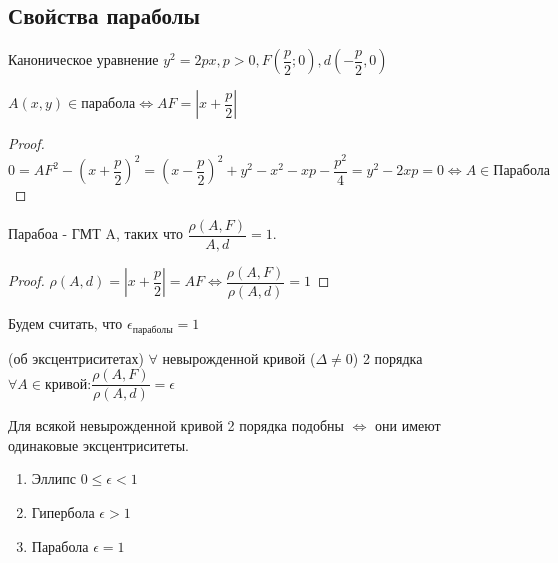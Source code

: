 \subsection{Свойства параболы}
Каноническое уравнение \(y^2=2px, p>0, F(\dfrac{p}{2};0), d(-\dfrac{p}{2},0)\)
\begin{proposition}
	\(A(x,y)\in\text{парабола}\Longleftrightarrow AF = |x+\dfrac{p}{2}|\)
\end{proposition}
\begin{proof}
	\(0 = AF^2 - (x+\dfrac{p}{2})^2 =(x-\dfrac{p}{2})^2+y^2-x^2-xp-\dfrac{p^2}{4} = y^2-2xp = 0\Longleftrightarrow A\in\text{Парабола}\)
\end{proof}
\begin{corollary}
	Парабоа - ГМТ A, таких что \(\dfrac{\rho(A, F)}{A, d} = 1\).
\end{corollary}
\begin{proof}
	\(\rho(A,d) = |x+\dfrac{p}{2}| = AF\Longleftrightarrow \dfrac{\rho(A,F)}{\rho(A, d)} = 1\)
\end{proof}
\begin{definition}
	Будем считать, что \(\epsilon_{\text{параболы}} = 1\)
\end{definition}

\begin{theorem}
	(об эксцентриситетах) \(\forall \) невырожденной кривой (\(\Delta\ne0\)) 2 порядка \(\forall A\in\text{кривой:}\dfrac{\rho(A,F)}{\rho(A, d)} = \epsilon\)
\end{theorem}
\begin{proposition}
	Для всякой невырожденной кривой 2 порядка подобны \(\Longleftrightarrow\) они имеют одинаковые эксцентриситеты.
	\begin{enumerate}
		\item Эллипс \(0\le\epsilon<1\) 
		\item Гипербола \(\epsilon>1\)
		\item Парабола \(\epsilon=1\)
	\end{enumerate}
\end{proposition}
